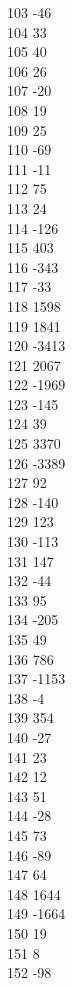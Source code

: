 { 103	-46 \\
 104	33 \\
 105	40 \\
 106	26 \\
 107	-20 \\
 108	19 \\
 109	25 \\
 110	-69 \\
 111	-11 \\
 112	75 \\
 113	24 \\
 114	-126 \\
 115	403 \\
 116	-343 \\
 117	-33 \\
 118	1598 \\
 119	1841 \\
 120	-3413 \\
 121	2067 \\
 122	-1969 \\
 123	-145 \\
 124	39 \\
 125	3370 \\
 126	-3389 \\
 127	92 \\
 128	-140 \\
 129	123 \\
 130	-113 \\
 131	147 \\
 132	-44 \\
 133	95 \\
 134	-205 \\
 135	49 \\
 136	786 \\
 137	-1153 \\
 138	-4 \\
 139	354 \\
 140	-27 \\
 141	23 \\
 142	12 \\
 143	51 \\
 144	-28 \\
 145	73 \\
 146	-89 \\
 147	64 \\
 148	1644 \\
 149	-1664 \\
 150	19 \\
 151	8 \\
 152	-98 \\
}
